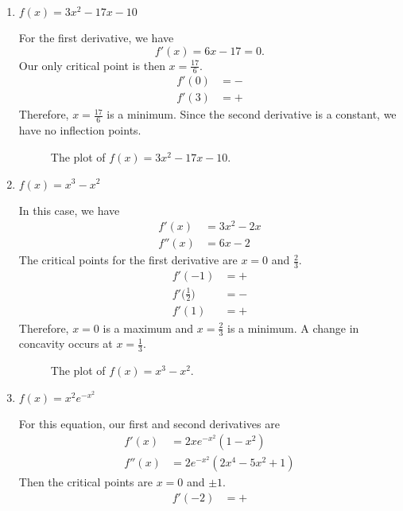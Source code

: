 \begin{enumerate}
\begin{enumerate}[label = (\alph*)]
\begin{figure}[H]
{        line.}
    \end{figure}
  \item
    \(f(x) = 3x^2 - 17x - 10\)
    \par\smallskip
    For the first derivative, we have
    \[
    f'(x) = 6x - 17 = 0.
    \]
    Our only critical point is then \(x = \frac{17}{6}\).
    \begin{align*}
      f'(0) &= -\\
      f'(3) &= +
    \end{align*}
    Therefore, \(x = \frac{17}{6}\) is a minimum.
    Since the second derivative is a constant, we have no inflection points.
    \begin{figure}[H]
      \centering
      
      \caption{The plot of \(f(x) = 3x^2 - 17x -10\).}
    \end{figure}
  \item
    \(f(x) = x^3 - x^2\)
    \par\smallskip
    In this case, we have
    \begin{align*}
      f'(x) &= 3x^2 - 2x\\
      f''(x) &= 6x - 2
    \end{align*}
    The critical points for the first derivative are \(x = 0\) and
    \(\frac{2}{3}\).
    \begin{align*}
      f'(-1) &= +\\
      f'\big(\frac{1}{2}\big) &= -\\
      f'(1) &= +
    \end{align*}
    Therefore, \(x = 0\) is a maximum and \(x = \frac{2}{3}\) is a minimum.
    A change in concavity occurs at \(x = \frac{1}{3}\).
    \begin{figure}[H]
      \centering
      
      \caption{The plot of \(f(x) = x^3 - x^2\).}
    \end{figure}
  \item
    \(f(x) = x^2e^{-x^2}\)
    \par\smallskip
    For this equation, our first and second derivatives are
    \begin{align*}
      f'(x) &= 2xe^{-x^2}(1 - x^2)\\
      f''(x) &= 2e^{-x^2}(2x^4 - 5x^2 + 1)
    \end{align*}
    Then the critical points are \(x = 0\) and \(\pm 1\).
    \begin{align*}
      f'(-2) &= +\\

\end{align*}
\end{enumerate}
\end{enumerate}
